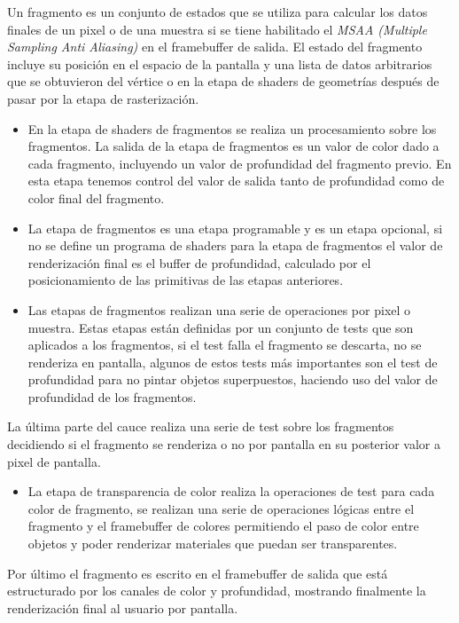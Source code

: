 \documentclass[a4paper]{book}
\begin{document}
Un fragmento es un conjunto de estados que se utiliza para calcular los datos finales de un pixel o de una muestra si se tiene
habilitado el \textit{MSAA (Multiple Sampling Anti Aliasing)} en el framebuffer de salida. El estado del fragmento incluye su posición
en el espacio de la pantalla y una lista de datos arbitrarios que se obtuvieron del vértice o en la etapa de shaders de geometrías
después de pasar por la etapa de rasterización.

\begin{itemize}
  \item En la etapa de shaders de fragmentos se realiza un procesamiento sobre los fragmentos. La salida de la etapa de fragmentos es
  un valor de color dado a cada fragmento, incluyendo un valor de profundidad del fragmento previo.  En esta etapa tenemos control
  del valor de salida tanto de profundidad como de color final del fragmento.

  \item La etapa de fragmentos es una etapa programable y es un etapa opcional, si no se define un programa de shaders para la etapa
  de fragmentos el valor de renderización final es el buffer de profundidad, calculado por el posicionamiento de las primitivas de
  las etapas anteriores.

  \item Las etapas de fragmentos realizan una serie de operaciones por pixel o muestra. Estas etapas están definidas por un conjunto
  de tests que son aplicados a los fragmentos, si el test falla el fragmento se descarta, no se renderiza en pantalla, algunos de
  estos tests más importantes son el test de profundidad para no pintar objetos superpuestos, haciendo uso del valor de profundidad
  de los fragmentos.
\end{itemize}

La última parte del cauce realiza una serie de test sobre los fragmentos decidiendo si el fragmento se renderiza o no por pantalla en
su posterior valor a pixel de pantalla.

\begin{itemize}
  \item  La etapa de transparencia de color realiza la operaciones de test para cada color de fragmento, se realizan una serie de
  operaciones lógicas entre el fragmento y el framebuffer de colores permitiendo el paso de color entre objetos y poder renderizar
  materiales que puedan ser transparentes.
\end{itemize}

Por último el fragmento es escrito en el framebuffer de salida que está estructurado por los canales de color y profundidad, mostrando
finalmente la renderización final al usuario por pantalla. \cite{article:_opengl_arch} \cite{article:_opengl_bottlenecks} \cite{book:_opengl} \cite{book:rendering}
\end{document}
